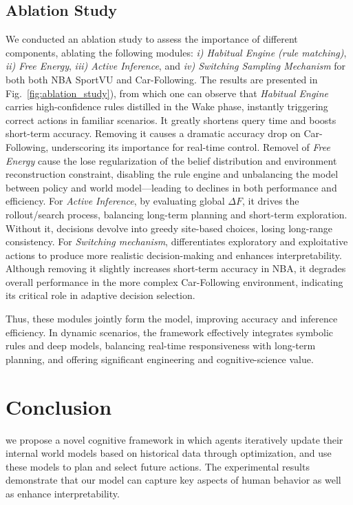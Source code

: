 \documentclass{article} %
\begin{document}
\subsection{Ablation Study}
\vspace{-5pt}
We conducted an ablation study to assess the importance of different components, ablating the following modules: {\it i) Habitual Engine (rule matching)}, {\it ii) Free Energy}, {\it iii) Active Inference}, and {\it iv) Switching Sampling Mechanism} for both both NBA SportVU and Car-Following. The results are presented in Fig.~\ref{fig:ablation_study}), from which one can observe that {\it Habitual Engine} carries high-confidence rules distilled in the Wake phase, instantly triggering correct actions in familiar scenarios. It greatly shortens query time and boosts short-term accuracy. Removing it causes a dramatic accuracy drop on Car-Following, underscoring its importance for real-time control. Removel of {\it Free Energy} cause the lose regularization of the belief distribution and environment reconstruction constraint, disabling the rule engine and unbalancing the model between policy and world model—leading to declines in both performance and efficiency. For {\it Active Inference}, by evaluating global \(\Delta F\), it drives the rollout/search process, balancing long-term planning and short-term exploration. Without it, decisions devolve into greedy site-based choices, losing long-range consistency. For {\it Switching mechanism}, differentiates exploratory and exploitative actions to produce more realistic decision-making and enhances interpretability. Although removing it slightly increases short-term accuracy in NBA, it degrades overall performance in the more complex Car-Following environment, indicating its critical role in adaptive decision selection.

Thus, these modules jointly form the model, improving accuracy and inference efficiency. In dynamic scenarios, the framework effectively integrates symbolic rules and deep models, balancing real-time responsiveness with long-term planning, and offering significant engineering and cognitive-science value.


\section{Conclusion}
\label{sec:conclusion}
\vspace{-5pt}
we propose a novel cognitive framework in which agents iteratively update their internal world models based on historical data through optimization, and use these models to plan and select future actions. The experimental results demonstrate that our model can capture key aspects of human behavior as well as enhance interpretability.
\fi
\end{document}
